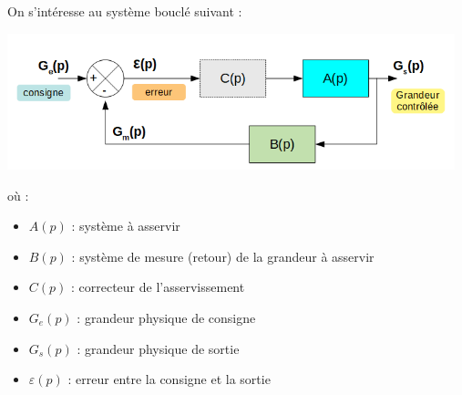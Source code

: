 \documentclass[a4paper,french]{paper}
\author{Julien VILLEMEJANE}
\subtitle{TD 4}
\title{\titre}
\begin{document}
 
\enteteThematiqueObligatoire{}

\vspace{-1cm}

On s'intéresse au système bouclé suivant :

\begin{center}
	\includegraphics[width=13cm]{images/syst_asservi.png}
\end{center}

où :

\begin{itemize}
	\item $A(p)$ : système à asservir
	\item $B(p)$ : système de mesure (retour) de la grandeur à asservir
	\item $C(p)$ : correcteur de l'asservissement
	\item $G_e(p)$ : grandeur physique de consigne
	\item $G_s(p)$ : grandeur physique de sortie
	\item $\varepsilon(p)$ : erreur entre la consigne et la sortie
\end{itemize}
\end{document}

